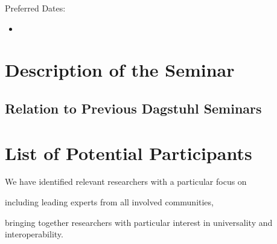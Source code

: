 \documentclass[a4paper,11pt]{article}
\begin{document}
\noindent
Preferred Dates: 
 \begin{itemize}
 \item 
\end{itemize}

\section{Description of the Seminar}
  

\subsection{Relation to Previous Dagstuhl Seminars}


\section{List of Potential Participants}

We have identified  relevant researchers with a particular focus on
\begin{compactitem}
  \item including leading experts from all involved communities,
  \item bringing together researchers with particular interest in universality and interoperability.
\end{compactitem}
\medskip

\end{document}
